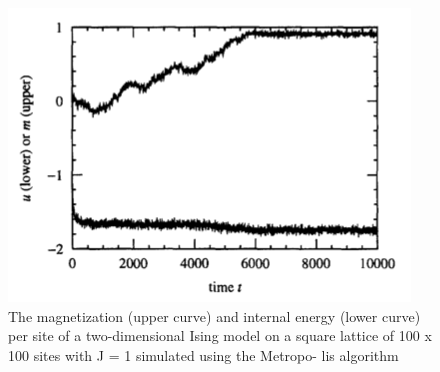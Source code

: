         \begin{figure}[H]
            \centering
            \includegraphics[scale=0.4]{ThermalizationWaBar.png}
            \caption{The magnetization (upper curve) and internal energy (lower curve) 
            per site of a two-dimensional Ising model on a square lattice of 100 x 100 sites with J = 1 
            simulated using the Metropo- lis algorithm}
            \label{fig:NewmanBarkema} 
        \end{figure}

